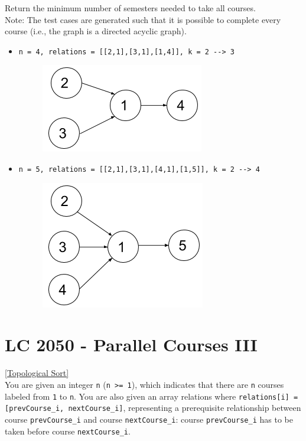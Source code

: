 Return the minimum number of semesters needed to take all courses.\\

Note: The test cases are generated such that it is possible to complete every course (i.e., the graph is a directed acyclic graph).

\begin{itemize}
\item {\colorbox{CodeBackground}{\lstinline|n = 4, relations = [[2,1],[3,1],[1,4]], k = 2 --> 3|}}
\begin{figure}[H]
\centering
\includegraphics[width=0.3\linewidth]{images/lc1494_eg1}
\end{figure}
\item {\colorbox{CodeBackground}{\lstinline|n = 5, relations = [[2,1],[3,1],[4,1],[1,5]], k = 2 --> 4|}}
\begin{figure}[H]
\centering
\includegraphics[width=0.3\linewidth]{images/lc1494_eg2}
\end{figure}
\end{itemize}

\section{LC 2050 - Parallel Courses III}\label{lc2050}
{\hyperref[sec:topological_sort]{[Topological Sort]}}\\

You are given an integer {\colorbox{CodeBackground}{\lstinline|n|}} ({\colorbox{CodeBackground}{\lstinline|n >= 1|}}), which indicates that there are {\colorbox{CodeBackground}{\lstinline|n|}} courses labeled from {\colorbox{CodeBackground}{\lstinline|1|}} to {\colorbox{CodeBackground}{\lstinline|n|}}. You are also given an array relations where {\colorbox{CodeBackground}{\lstinline|relations[i] = [prevCourse_i, nextCourse_i]|}}, representing a prerequisite relationship between course {\colorbox{CodeBackground}{\lstinline|prevCourse_i|}} and course {\colorbox{CodeBackground}{\lstinline|nextCourse_i|}}: course {\colorbox{CodeBackground}{\lstinline|prevCourse_i|}} has to be taken before course {\colorbox{CodeBackground}{\lstinline|nextCourse_i|}}.\\

